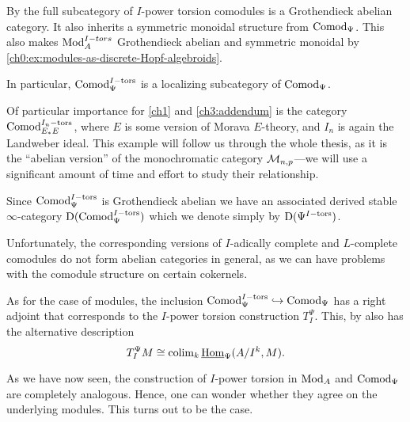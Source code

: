 \begin{remark}
    \label{ch0:rm:torsion-comodules-grothendieck-monoidal}
    By \cite[5.10]{barthel-heard-valenzuela_2018} the full subcategory of $I$-power torsion comodules is a Grothendieck abelian category. It also inherits a symmetric monoidal structure from $\mathrm{Comod}_\Psi$. This also makes $\mathrm{Mod}_A^{I-tors}$ Grothendieck abelian and symmetric monoidal by \cref{ch0:ex:modules-as-discrete-Hopf-algebroids}. 
\end{remark}

\begin{remark}
    In particular, $\mathrm{Comod}_\Psi^{I-\mathrm{tors}}$ is a localizing subcategory of $\mathrm{Comod}_\Psi$. 
\end{remark}

\begin{example}
    Of particular importance for \cref{ch1} and \cref{ch3:addendum} is the category $\mathrm{Comod}_{E_*E}^{I_n-\mathrm{tors}}$, where $E$ is some  version of Morava $E$-theory, and $I_n$ is again the Landweber ideal. This example will follow us through the whole thesis, as it is the ``abelian version'' of the monochromatic category $\mathcal{M}_{n,p}$---we will use a significant amount of time and effort to study their relationship. 
\end{example}

\begin{notation}
    Since $\mathrm{Comod}_\Psi^{I-\mathrm{tors}}$ is Grothendieck abelian we have an associated derived stable $\infty$-category $\mathrm{D}(\mathrm{Comod}_\Psi^{I-\mathrm{tors}})$ which we denote simply by $\mathrm{D}(\Psi^{I-\mathrm{tors}})$.
\end{notation}

\begin{remark}
    \label{ch0:rm:complete-comodules-not-abelian}
    Unfortunately, the corresponding versions of $I$-adically complete and $L$-complete comodules do not form abelian categories in general, as we can have problems with the comodule structure on certain cokernels.
\end{remark}

As for the case of modules, the inclusion $\mathrm{Comod}_\Psi^{I-\mathrm{tors}}\hookrightarrow \mathrm{Comod}_\Psi$ has a right adjoint that corresponds to the $I$-power torsion construction $T_I^\Psi$. This, by \cite[5.5]{barthel-heard-valenzuela_2018} also has the alternative description
\[T_I^\Psi M \cong \operatorname{colim}_k \operatorname{\underline{Hom}}_\Psi (A/I^k, M).\]

As we have now seen, the construction of $I$-power torsion in $\mathrm{Mod}_A$ and $\mathrm{Comod}_\Psi$ are completely analogous. Hence, one can wonder whether they agree on the underlying modules. This turns out to be the case. 

